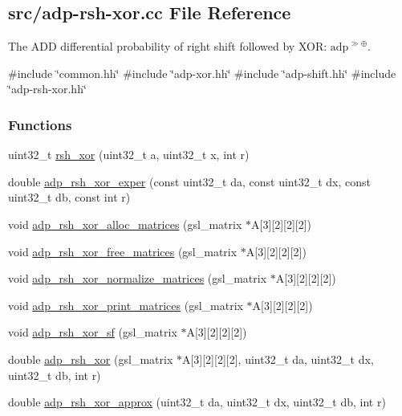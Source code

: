 \hypertarget{adp-rsh-xor_8cc}{\subsection{src/adp-\/rsh-\/xor.cc \-File \-Reference}
\label{adp-rsh-xor_8cc}
}


\-The \-A\-D\-D differential probability of right shift followed by \-X\-O\-R\-: $\mathrm{adp}^{\gg\oplus}$.  


{\ttfamily \#include \char`\"{}common.\-hh\char`\"{}}\*
{\ttfamily \#include \char`\"{}adp-\/xor.\-hh\char`\"{}}\*
{\ttfamily \#include \char`\"{}adp-\/shift.\-hh\char`\"{}}\*
{\ttfamily \#include \char`\"{}adp-\/rsh-\/xor.\-hh\char`\"{}}\*
\subsubsection*{\-Functions}
\begin{DoxyCompactItemize}
\item 
uint32\-\_\-t \hyperlink{adp-rsh-xor_8cc_ac0367fa7d61faaf3b1b661de03ff932f}{rsh\-\_\-xor} (uint32\-\_\-t a, uint32\-\_\-t x, int r)
\item 
double \hyperlink{adp-rsh-xor_8cc_a2b0e5e4fad623f4e3246a25b897aa984}{adp\-\_\-rsh\-\_\-xor\-\_\-exper} (const uint32\-\_\-t da, const uint32\-\_\-t dx, const uint32\-\_\-t db, const int r)
\item 
void \hyperlink{adp-rsh-xor_8cc_a75f7c2477e1ccb1ea0d903024fe26a4e}{adp\-\_\-rsh\-\_\-xor\-\_\-alloc\-\_\-matrices} (gsl\-\_\-matrix $\ast$\-A\mbox{[}3\mbox{]}\mbox{[}2\mbox{]}\mbox{[}2\mbox{]}\mbox{[}2\mbox{]})
\item 
void \hyperlink{adp-rsh-xor_8cc_ae9cae9f38ce4ca450faa24c5dc4def67}{adp\-\_\-rsh\-\_\-xor\-\_\-free\-\_\-matrices} (gsl\-\_\-matrix $\ast$\-A\mbox{[}3\mbox{]}\mbox{[}2\mbox{]}\mbox{[}2\mbox{]}\mbox{[}2\mbox{]})
\item 
void \hyperlink{adp-rsh-xor_8cc_a0a7be269d6973d2d8b14d3425aa7d7c1}{adp\-\_\-rsh\-\_\-xor\-\_\-normalize\-\_\-matrices} (gsl\-\_\-matrix $\ast$\-A\mbox{[}3\mbox{]}\mbox{[}2\mbox{]}\mbox{[}2\mbox{]}\mbox{[}2\mbox{]})
\item 
void \hyperlink{adp-rsh-xor_8cc_afaee6cf06ffdf316c8c2f62d6fe4c0c3}{adp\-\_\-rsh\-\_\-xor\-\_\-print\-\_\-matrices} (gsl\-\_\-matrix $\ast$\-A\mbox{[}3\mbox{]}\mbox{[}2\mbox{]}\mbox{[}2\mbox{]}\mbox{[}2\mbox{]})
\item 
void \hyperlink{adp-rsh-xor_8cc_a0084433781fe544264dfa08494b4d347}{adp\-\_\-rsh\-\_\-xor\-\_\-sf} (gsl\-\_\-matrix $\ast$\-A\mbox{[}3\mbox{]}\mbox{[}2\mbox{]}\mbox{[}2\mbox{]}\mbox{[}2\mbox{]})
\item 
double \hyperlink{adp-rsh-xor_8cc_ab5601221902574eabd3ae7bc6c1dc470}{adp\-\_\-rsh\-\_\-xor} (gsl\-\_\-matrix $\ast$\-A\mbox{[}3\mbox{]}\mbox{[}2\mbox{]}\mbox{[}2\mbox{]}\mbox{[}2\mbox{]}, uint32\-\_\-t da, uint32\-\_\-t dx, uint32\-\_\-t db, int r)
\item 
double \hyperlink{adp-rsh-xor_8cc_ad1cca89daeb0fbc44dbef81d81e083f1}{adp\-\_\-rsh\-\_\-xor\-\_\-approx} (uint32\-\_\-t da, uint32\-\_\-t dx, uint32\-\_\-t db, int r)
\end{DoxyCompactItemize}



